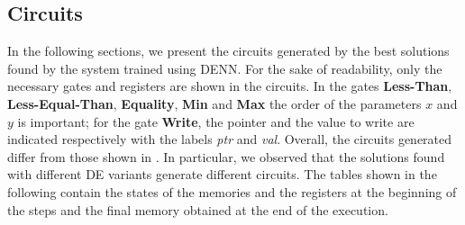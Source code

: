 \subsection{Circuits}\label{subsec:circuits}
In the following sections, we present the circuits generated by the best solutions found by the system trained using DENN. For the sake of readability, only the necessary gates and registers are shown in the circuits. In the gates \textbf{Less-Than}, \textbf{Less-Equal-Than}, \textbf{Equality}, \textbf{Min} and \textbf{Max} the order of the parameters $x$ and $y$ is important; for the gate \textbf{Write}, the pointer and the value to write are indicated respectively with the labels \textit{ptr} and \textit{val}.\newline\newline
Overall, the circuits generated differ from those shown in \cite{NRAM:2016}. In particular, we observed that the solutions found with different DE variants generate different circuits. The tables shown in the following contain the states of the memories and the registers at the beginning of the steps and the final memory obtained at the end of the execution.
\clearpage

